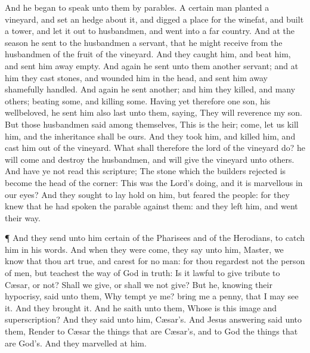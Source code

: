  And he began to speak unto them by parables. A certain man
planted a vineyard, and set an hedge about it, and digged a place for
the winefat, and built a tower, and let it out to husbandmen, and went
into a far country.  And at the season he sent to the
husbandmen a servant, that he might receive from the husbandmen of the
fruit of the vineyard.  And they caught him, and beat him,
and sent him away empty.  And again he sent unto them
another servant; and at him they cast stones, and wounded him in the
head, and sent him away shamefully handled.  And again he
sent another; and him they killed, and many others; beating some, and
killing some.  Having yet therefore one son, his
wellbeloved, he sent him also last unto them, saying, They will
reverence my son.  But those husbandmen said among
themselves, This is the heir; come, let us kill him, and the inheritance
shall be ours.  And they took him, and killed him, and cast
him out of the vineyard.  What shall therefore the lord of
the vineyard do? he will come and destroy the husbandmen, and will give
the vineyard unto others.  And have ye not read this
scripture; The stone which the builders rejected is become the head of
the corner:  This was the Lord's doing, and it is
marvellous in our eyes?  And they sought to lay hold on
him, but feared the people: for they knew that he had spoken the parable
against them: and they left him, and went their way.

 ¶ And they send unto him certain of the Pharisees and of
the Herodians, to catch him in his words.  And when they
were come, they say unto him, Master, we know that thou art true, and
carest for no man: for thou regardest not the person of men, but
teachest the way of God in truth: Is it lawful to give tribute to Cæsar,
or not?  Shall we give, or shall we not give? But he,
knowing their hypocrisy, said unto them, Why tempt ye me? bring me a
penny, that I may see it.  And they brought it. And he
saith unto them, Whose is this image and superscription? And they said
unto him, Cæsar's.  And Jesus answering said unto them,
Render to Cæsar the things that are Cæsar's, and to God the things that
are God's. And they marvelled at him.

